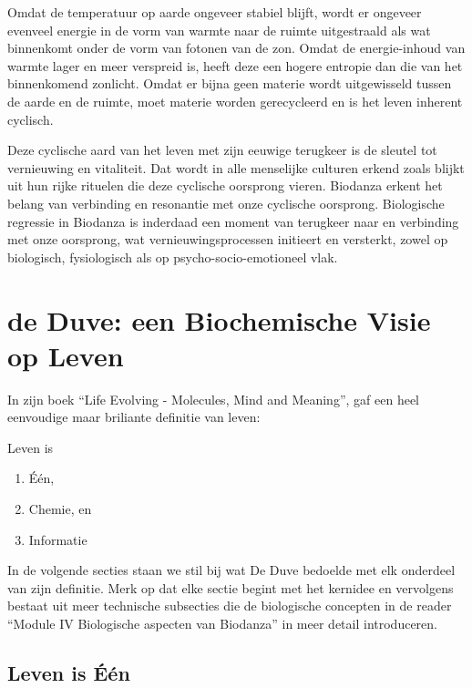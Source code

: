 \documentclass[
  11pt,
]{book}
\providecommand{\tightlist}{%
  \setlength{\itemsep}{0pt}\setlength{\parskip}{0pt}}
\begin{document}
Omdat de temperatuur op aarde ongeveer stabiel blijft, wordt er ongeveer evenveel energie in de vorm van warmte naar de ruimte uitgestraald als wat binnenkomt onder de vorm van fotonen van de zon. Omdat de energie-inhoud van warmte lager en meer verspreid is, heeft deze een hogere entropie dan die van het binnenkomend zonlicht. Omdat er bijna geen materie wordt uitgewisseld tussen de aarde en de ruimte, moet materie worden gerecycleerd en is het leven inherent cyclisch.

Deze cyclische aard van het leven met zijn eeuwige terugkeer is de sleutel tot vernieuwing en vitaliteit. Dat wordt in alle menselijke culturen erkend zoals blijkt uit hun rijke rituelen die deze cyclische oorsprong vieren. Biodanza erkent het belang van verbinding en resonantie met onze cyclische oorsprong. Biologische regressie in Biodanza is inderdaad een moment van terugkeer naar en verbinding met onze oorsprong, wat vernieuwingsprocessen initieert en versterkt, zowel op biologisch, fysiologisch als op psycho-socio-emotioneel vlak.

\newpage

\hypertarget{de-duve-een-biochemische-visie-op-leven}{%
\section{de Duve: een Biochemische Visie op Leven}\label{de-duve-een-biochemische-visie-op-leven}}

In zijn boek ``Life Evolving - Molecules, Mind and Meaning'', gaf \citet{deDuve2002} een heel eenvoudige maar briliante definitie van leven:

Leven is

\begin{enumerate}
\def\labelenumi{\arabic{enumi}.}
\tightlist
\item
  Één,
\item
  Chemie, en
\item
  Informatie
\end{enumerate}

In de volgende secties staan we stil bij wat De Duve bedoelde met elk onderdeel van zijn definitie. Merk op dat elke sectie begint met het kernidee en vervolgens bestaat uit meer technische subsecties die de biologische concepten in de reader ``Module IV Biologische aspecten van Biodanza'' in meer detail introduceren.

\hypertarget{lifeOne}{%
\subsection{Leven is Één}\label{lifeOne}}
\end{document}
